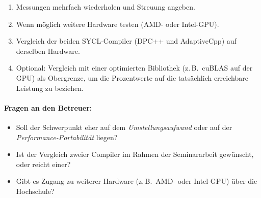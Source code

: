 \documentclass[11pt]{article}
\begin{document}
\begin{enumerate}
    \item Messungen mehrfach wiederholen und Streuung angeben.
    \item Wenn möglich weitere Hardware testen (AMD- oder Intel-GPU).
    \item Vergleich der beiden SYCL-Compiler (DPC++ und AdaptiveCpp) auf
    derselben Hardware.
    \item Optional: Vergleich mit einer optimierten Bibliothek (z.\,B.\
    cuBLAS auf der GPU) als Obergrenze, um die Prozentwerte auf die
    tatsächlich erreichbare Leistung zu beziehen.
\end{enumerate}

\paragraph{Fragen an den Betreuer:}
\begin{itemize}
    \item Soll der Schwerpunkt eher auf dem \emph{Umstellungsaufwand} oder
    auf der \emph{Performance-Portabilität} liegen?
    \item Ist der Vergleich zweier Compiler im Rahmen der Seminararbeit
    gewünscht, oder reicht einer?
    \item Gibt es Zugang zu weiterer Hardware (z.\,B.\ AMD- oder
    Intel-GPU) über die Hochschule?
\end{itemize}
\end{document}
